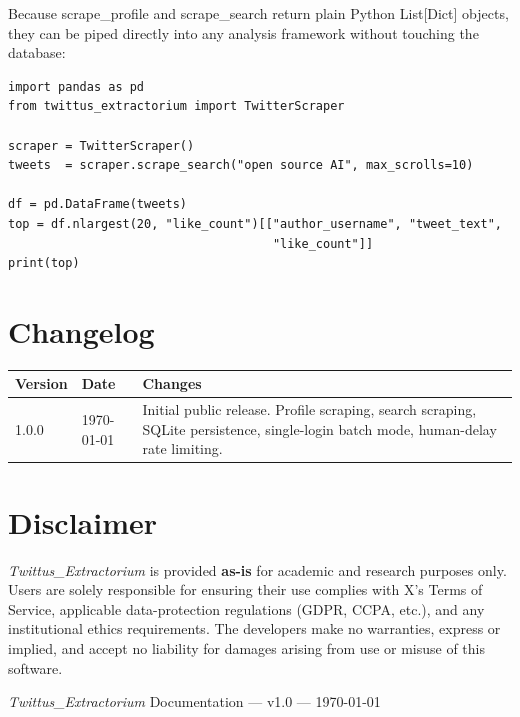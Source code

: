 \documentclass[11pt, a4paper]{article}
\newenvironment{warnbox}[1][Warning]{%
  \begin{tcolorbox}[enhanced, breakable,
    colback=TwRed!6, colframe=TwRed,
    boxrule=0.8pt, arc=5pt,
    left=8pt, right=8pt, top=5pt, bottom=5pt,
    title={\textbf{#1}},
    fonttitle=\small\color{TwRed},
    attach boxed title to top left={yshift=-2mm, xshift=8mm},
    boxed title style={colback=TwRed!6, colframe=TwRed, arc=3pt}]
}{\end{tcolorbox}}
\def\method#1{#1}%
\def\pytype#1{#1}%
\def\texttt#1{#1}%
\def\color#1{}%
\newcommand{\method}[1]{\texttt{\color{TwBlue}#1}}
\newcommand{\pytype}[1]{\texttt{\color{TwGray}#1}}
\begin{document}
Because \method{scrape\_profile} and \method{scrape\_search} return plain Python
\pytype{List[Dict]} objects, they can be piped directly into any analysis
framework without touching the database:

\begin{tcolorbox}[pybox, title=Inline analysis without database]
\begin{lstlisting}[style=pycode]
import pandas as pd
from twittus_extractorium import TwitterScraper

scraper = TwitterScraper()
tweets  = scraper.scrape_search("open source AI", max_scrolls=10)

df = pd.DataFrame(tweets)
top = df.nlargest(20, "like_count")[["author_username", "tweet_text",
                                     "like_count"]]
print(top)
\end{lstlisting}
\end{tcolorbox}

\section{Changelog}

\begin{center}
\begin{tabularx}{\linewidth}{llX}
\toprule
\textbf{Version} & \textbf{Date}   & \textbf{Changes} \\
\midrule
1.0.0   & \today  & Initial public release. Profile scraping, search scraping, SQLite persistence, single-login batch mode, human-delay rate limiting. \\
\bottomrule
\end{tabularx}
\end{center}

\section*{Disclaimer}

\begin{warnbox}[Legal Disclaimer]
\textit{Twittus\_Extractorium} is provided \textbf{as-is} for academic and research
purposes only. Users are solely responsible for ensuring their use complies with
X's Terms of Service, applicable data-protection regulations (GDPR, CCPA, etc.),
and any institutional ethics requirements. The developers make no warranties,
express or implied, and accept no liability for damages arising from use or
misuse of this software.
\end{warnbox}

\vfill
\begin{center}
\small\color{TwGray}
\textit{Twittus\_Extractorium} Documentation --- v1.0 --- \today\\[2pt]
\end{center}
\end{document}
